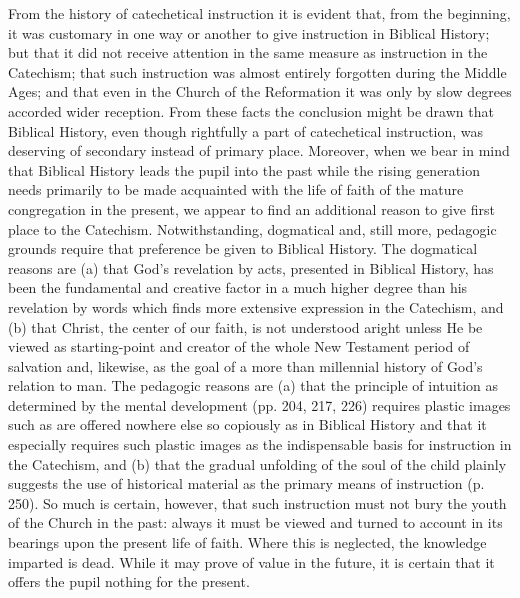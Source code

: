 From the history of catechetical instruction it is evident that, from the beginning, it was customary in one way or another to give instruction in Biblical History; but that it did not receive attention in the same measure as instruction in the Catechism; that such instruction was almost entirely forgotten during the Middle Ages; and that even in the Church of the Reformation it was only by slow degrees accorded wider reception. From these facts the conclusion might be drawn that Biblical History, even though rightfully a part of catechetical instruction, was deserving of secondary instead of primary place. Moreover, when we bear in mind that Biblical History leads the pupil into the past while the rising generation needs primarily to be made acquainted with the life of faith of the mature congregation in the present,
we appear to find an additional reason to give first place to the Catechism. Notwithstanding, dogmatical and, still more, pedagogic grounds require that preference be given to Biblical History. The dogmatical reasons are (a) that God’s revelation by acts, presented in Biblical History, has been the fundamental and creative factor in a much higher degree than his revelation by words which finds more extensive expression in the Catechism, and (b) that Christ, the center of our faith, is not understood aright unless He be viewed as starting-point and creator of the whole New Testament period of salvation and, likewise, as the goal of a more than millennial history of God’s relation to man. The pedagogic reasons are (a) that the principle of intuition as determined by the mental development (pp. 204, 217, 226) requires plastic images such as are offered nowhere else so copiously as in Biblical History and that it especially requires such plastic images as the indispensable basis for instruction in the Catechism, and (b) that the gradual unfolding of the soul of the child plainly suggests the use of historical material as the primary means of instruction (p. 250). So much is certain, however, that such instruction must not bury the youth of the Church in the past: always it must be viewed and turned to account in its bearings upon the present life of faith. Where this is neglected, the knowledge imparted is dead. While it may prove of value in the future, it is certain that it offers the pupil nothing for the present.

